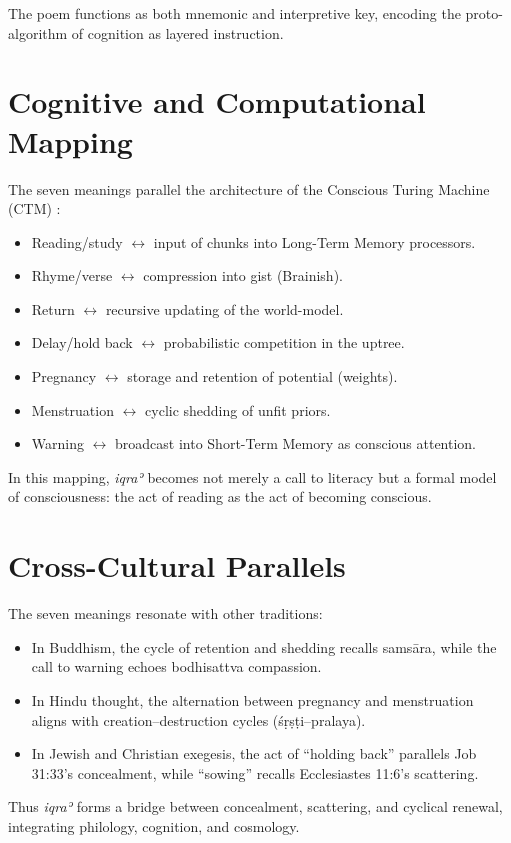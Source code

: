 \documentclass[a4paper,11pt,openany]{book}
\begin{document}
The poem functions as both mnemonic and interpretive key, encoding the proto-algorithm of cognition as layered instruction.

\section{Cognitive and Computational Mapping}
The seven meanings parallel the architecture of the Conscious Turing Machine (CTM) \citep{blum2021ctm}:
\begin{itemize}
  \item Reading/study $\leftrightarrow$ input of chunks into Long-Term Memory processors.
  \item Rhyme/verse $\leftrightarrow$ compression into gist (Brainish).
  \item Return $\leftrightarrow$ recursive updating of the world-model.
  \item Delay/hold back $\leftrightarrow$ probabilistic competition in the uptree.
  \item Pregnancy $\leftrightarrow$ storage and retention of potential (weights).
  \item Menstruation $\leftrightarrow$ cyclic shedding of unfit priors.
  \item Warning $\leftrightarrow$ broadcast into Short-Term Memory as conscious attention.
\end{itemize}
In this mapping, \textit{iqraʾ} becomes not merely a call to literacy but a formal model of consciousness: the act of reading as the act of becoming conscious.

\section{Cross-Cultural Parallels}
The seven meanings resonate with other traditions:
\begin{itemize}
  \item In Buddhism, the cycle of retention and shedding recalls samsāra, while the call to warning echoes bodhisattva compassion.
  \item In Hindu thought, the alternation between pregnancy and menstruation aligns with creation–destruction cycles (śṛṣṭi–pralaya).
  \item In Jewish and Christian exegesis, the act of ``holding back'' parallels Job 31:33’s concealment, while ``sowing'' recalls Ecclesiastes 11:6’s scattering.
\end{itemize}
Thus \textit{iqraʾ} forms a bridge between concealment, scattering, and cyclical renewal, integrating philology, cognition, and cosmology.
\end{document}
